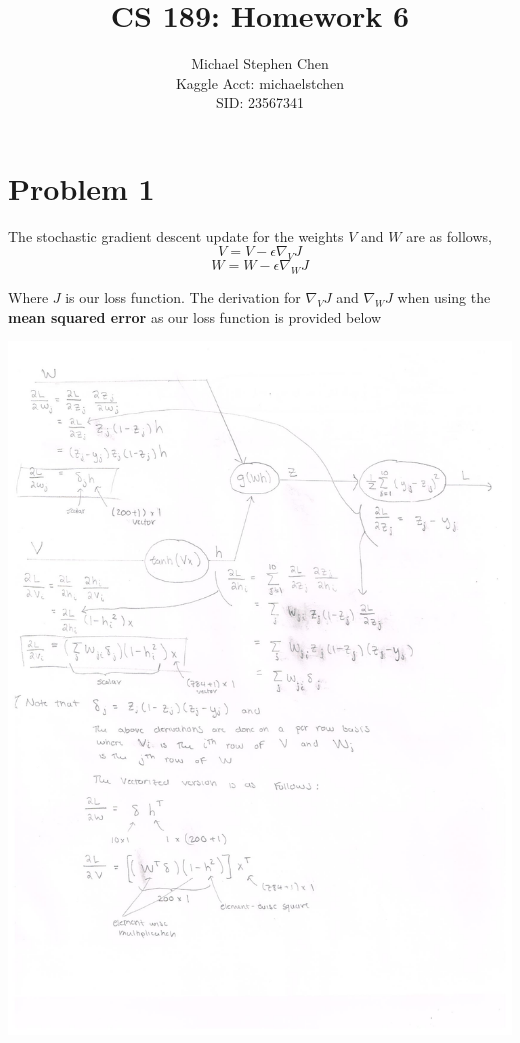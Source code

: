 \documentclass{article}
\title{CS 189: Homework 6}
\author{Michael Stephen Chen\\ Kaggle Acct: michaelstchen \\SID: 23567341}
\begin{document}
\maketitle

\pagebreak

\section*{Problem 1}
The stochastic gradient descent update for the weights $V$ and $W$ are as follows,
$$V = V - \epsilon \nabla_V J$$
$$W = W - \epsilon \nabla_W J$$

Where $J$ is our loss function. The derivation for $\nabla_V J$ and $\nabla_W J$ when using the \textbf{mean squared error} as our loss function is provided below
\begin{center}
\includegraphics[scale=0.65]{001}
\end{center}
\end{document}
